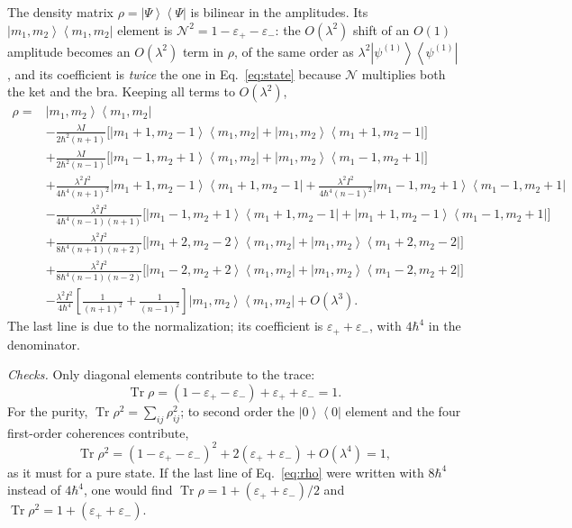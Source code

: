 \documentclass[aps,pra,onecolumn,notitlepage,nofootinbib,11pt]{revtex4-2}
\newcommand{\Tr}{\operatorname{Tr}}
\newcommand{\ketbra}[2]{\left|#1\right\rangle\!\left\langle#2\right|}
\newcommand{\epsp}{\varepsilon_{+}}
\newcommand{\epsm}{\varepsilon_{-}}
\begin{document}
The density matrix $\rho=\ketbra\Psi\Psi$ is bilinear in the amplitudes. Its
$\ketbra{m_{1},m_{2}}{m_{1},m_{2}}$ element is $\mathcal{N}^{2}=1-\epsp-\epsm$: the
$O(\lambda^{2})$ shift of an $O(1)$ amplitude becomes an $O(\lambda^{2})$ term in
$\rho$, of the same order as $\lambda^{2}\ketbra{\psi^{(1)}}{\psi^{(1)}}$, and its
coefficient is \emph{twice} the one in Eq.~\eqref{eq:state} because $\mathcal{N}$
multiplies both the ket and the bra. Keeping all terms to $O(\lambda^{2})$,
\begingroup\small
\begin{align}
\rho={}&\ketbra{m_{1},m_{2}}{m_{1},m_{2}}\nonumber\\
&-\frac{\lambda I}{2\hbar^{2}(n+1)}\Big[\ketbra{m_{1}+1,m_{2}-1}{m_{1},m_{2}}
+\ketbra{m_{1},m_{2}}{m_{1}+1,m_{2}-1}\Big]\nonumber\\
&+\frac{\lambda I}{2\hbar^{2}(n-1)}\Big[\ketbra{m_{1}-1,m_{2}+1}{m_{1},m_{2}}
+\ketbra{m_{1},m_{2}}{m_{1}-1,m_{2}+1}\Big]\nonumber\\
&+\frac{\lambda^{2}I^{2}}{4\hbar^{4}(n+1)^{2}}\ketbra{m_{1}+1,m_{2}-1}{m_{1}+1,m_{2}-1}
+\frac{\lambda^{2}I^{2}}{4\hbar^{4}(n-1)^{2}}\ketbra{m_{1}-1,m_{2}+1}{m_{1}-1,m_{2}+1}
\nonumber\\
&-\frac{\lambda^{2}I^{2}}{4\hbar^{4}(n-1)(n+1)}\Big[\ketbra{m_{1}-1,m_{2}+1}{m_{1}+1,m_{2}-1}
+\ketbra{m_{1}+1,m_{2}-1}{m_{1}-1,m_{2}+1}\Big]\nonumber\\
&+\frac{\lambda^{2}I^{2}}{8\hbar^{4}(n+1)(n+2)}\Big[\ketbra{m_{1}+2,m_{2}-2}{m_{1},m_{2}}
+\ketbra{m_{1},m_{2}}{m_{1}+2,m_{2}-2}\Big]\nonumber\\
&+\frac{\lambda^{2}I^{2}}{8\hbar^{4}(n-1)(n-2)}\Big[\ketbra{m_{1}-2,m_{2}+2}{m_{1},m_{2}}
+\ketbra{m_{1},m_{2}}{m_{1}-2,m_{2}+2}\Big]\nonumber\\
&-\frac{\lambda^{2}I^{2}}{4\hbar^{4}}\left[\frac{1}{(n+1)^{2}}+\frac{1}{(n-1)^{2}}\right]
\ketbra{m_{1},m_{2}}{m_{1},m_{2}}+O(\lambda^{3}).
\label{eq:rho}
\end{align}
\endgroup
The last line is due to the normalization; its coefficient is $\epsp+\epsm$, with
$4\hbar^{4}$ in the denominator.

\emph{Checks.} Only diagonal elements contribute to the trace:
\begin{equation}
\Tr\rho=(1-\epsp-\epsm)+\epsp+\epsm=1 .
\end{equation}
For the purity, $\Tr\rho^{2}=\sum_{ij}\rho_{ij}^{2}$; to second order the
$\ketbra00$ element and the four first-order coherences contribute,
\begin{equation}
\Tr\rho^{2}=(1-\epsp-\epsm)^{2}+2(\epsp+\epsm)+O(\lambda^{4})=1,
\end{equation}
as it must for a pure state. If the last line of Eq.~\eqref{eq:rho} were written with
$8\hbar^{4}$ instead of $4\hbar^{4}$, one would find $\Tr\rho=1+(\epsp+\epsm)/2$ and
$\Tr\rho^{2}=1+(\epsp+\epsm)$.
\end{document}
